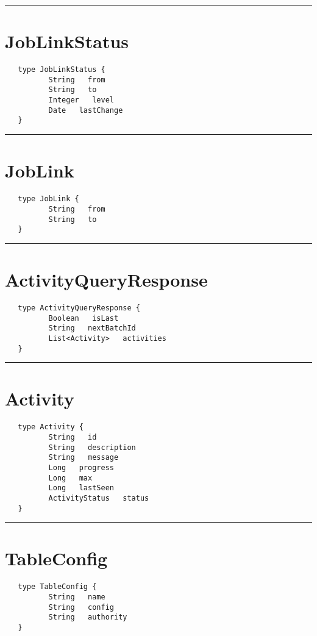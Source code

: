 \rule{15cm}{2pt}
\section{JobLinkStatus}
\label{type:JobLinkStatus}

\begin{verbatim}
   type JobLinkStatus {
          String   from
          String   to
          Integer   level
          Date   lastChange
   }
\end{verbatim}

\rule{15cm}{2pt}
\section{JobLink}
\label{type:JobLink}

\begin{verbatim}
   type JobLink {
          String   from
          String   to
   }
\end{verbatim}

\rule{15cm}{2pt}
\section{ActivityQueryResponse}
\label{type:ActivityQueryResponse}

\begin{verbatim}
   type ActivityQueryResponse {
          Boolean   isLast
          String   nextBatchId
          List<Activity>   activities
   }
\end{verbatim}

\rule{15cm}{2pt}
\section{Activity}
\label{type:Activity}

\begin{verbatim}
   type Activity {
          String   id
          String   description
          String   message
          Long   progress
          Long   max
          Long   lastSeen
          ActivityStatus   status
   }
\end{verbatim}

\rule{15cm}{2pt}
\section{TableConfig}
\label{type:TableConfig}

\begin{verbatim}
   type TableConfig {
          String   name
          String   config
          String   authority
   }
\end{verbatim}

